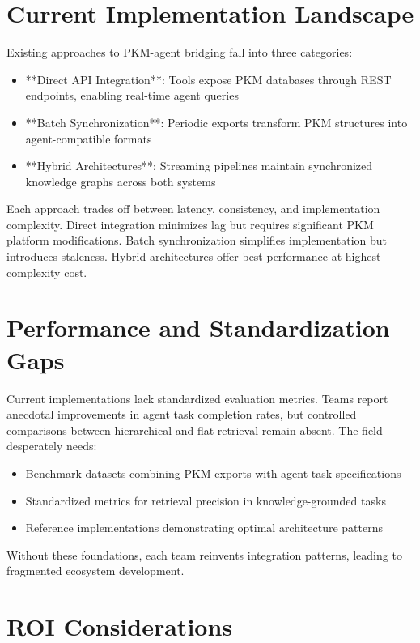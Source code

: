 \documentclass[a4paper,11pt]{article}
\begin{document}
\section{Current Implementation Landscape}

Existing approaches to PKM-agent bridging fall into three categories:


\begin{itemize}
  \item **Direct API Integration**: Tools expose PKM databases through REST endpoints, enabling real-time agent queries
  \item **Batch Synchronization**: Periodic exports transform PKM structures into agent-compatible formats
  \item **Hybrid Architectures**: Streaming pipelines maintain synchronized knowledge graphs across both systems
\end{itemize}

Each approach trades off between latency, consistency, and implementation complexity. Direct integration minimizes lag but requires significant PKM platform modifications. Batch synchronization simplifies implementation but introduces staleness. Hybrid architectures offer best performance at highest complexity cost.


\section{Performance and Standardization Gaps}

Current implementations lack standardized evaluation metrics. Teams report anecdotal improvements in agent task completion rates, but controlled comparisons between hierarchical and flat retrieval remain absent. The field desperately needs:


\begin{itemize}
  \item Benchmark datasets combining PKM exports with agent task specifications
  \item Standardized metrics for retrieval precision in knowledge-grounded tasks
  \item Reference implementations demonstrating optimal architecture patterns
\end{itemize}

Without these foundations, each team reinvents integration patterns, leading to fragmented ecosystem development.


\section{ROI Considerations}
\end{document}
